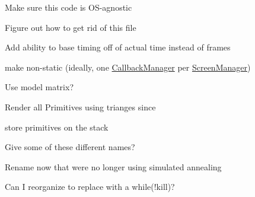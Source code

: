 
\begin{DoxyRefList}
\item[\label{todo__todo000006}%
\Hypertarget{todo__todo000006}%
Namespace \hyperlink{namespacenta}{nta} ]Make sure this code is O\+S-\/agnostic 

Figure out how to get rid of this file  
\item[\label{todo__todo000001}%
\Hypertarget{todo__todo000001}%
Class \hyperlink{classnta_1_1CallbackManager}{nta\+:\+:Callback\+Manager} ]Add ability to base timing off of actual time instead of frames 

make non-\/static (ideally, one \hyperlink{classnta_1_1CallbackManager}{Callback\+Manager} per \hyperlink{classnta_1_1ScreenManager}{Screen\+Manager})  
\item[\label{todo__todo000004}%
\Hypertarget{todo__todo000004}%
Member \hyperlink{structnta_1_1Glyph_a3b2afa4370140736d9d1b28de20d2105}{nta\+:\+:Glyph\+:\+:Glyph} (crvec4 pos\+Rect, crvec4 uv\+Rect, G\+Luint tex, float d, crvec4 col, float angle)]Use model matrix?  
\item[\label{todo__todo000007}%
\Hypertarget{todo__todo000007}%
Member \hyperlink{classnta_1_1PrimitiveBatch_a8b1bcf740a16d65a79566c0a9aebd117}{nta\+:\+:Primitive\+Batch\+:\+:create\+Render\+Batches} ()]Render all Primitives using trianges since  
\item[\label{todo__todo000003}%
\Hypertarget{todo__todo000003}%
Member \hyperlink{classnta_1_1PrimitiveBatch_a85b1ab0111c7d02d5899f47fe1946c4f}{nta\+:\+:Primitive\+Batch\+:\+:m\+\_\+primitives} ]store primitives on the stack  
\item[\label{todo__todo000005}%
\Hypertarget{todo__todo000005}%
Member \hyperlink{classnta_1_1SpriteBatch_aa703fb92d0bd42865c21fdfb2625660d}{nta\+:\+:Sprite\+Batch\+:\+:add\+Glyph} (crvec4 pos\+Rect, crvec4 uv\+Rect, G\+Luint texture, float depth=N\+T\+A\+\_\+\+D\+E\+F\+A\+U\+L\+T\+\_\+\+D\+E\+P\+TH, crvec4 color=glm\+::vec4(1))]Give some of these different names?  
\item[\label{todo__todo000008}%
\Hypertarget{todo__todo000008}%
Member \hyperlink{classnta_1_1SpriteFont_a9dc96f31efd0830dcb476ea87534e358}{nta\+:\+:Sprite\+Font\+:\+:Sprite\+Font} (crstring font\+Path, unsigned int size)]Rename now that we\textquotesingle{}re no longer using simulated annealing  
\item[\label{todo__todo000009}%
\Hypertarget{todo__todo000009}%
Member \hyperlink{classnta_1_1utils_1_1ThreadPool_a2ca98ba5ed4510e5aac90c0507859b8d}{nta\+:\+:utils\+:\+:Thread\+Pool\+:\+:dispatcher} ()]Can I reorganize to replace with a while(!kill)? 
\end{DoxyRefList}